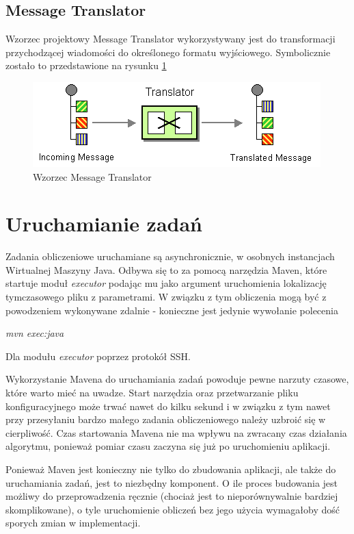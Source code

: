 \subsection{Message Translator}
Wzorzec projektowy Message Translator wykorzystywany jest do transformacji przychodzącej wiadomości do określonego formatu wyjściowego.
Symbolicznie zostało to przedstawione na rysunku \ref{fig:messageTranslator}

\begin{figure}[!h]
 \centering
 \includegraphics{eip/MessageTranslator}
 \caption{Wzorzec Message Translator}
 \label{fig:messageTranslator}
\end{figure}

\section{Uruchamianie zadań}

Zadania obliczeniowe uruchamiane są asynchronicznie, w osobnych instancjach Wirtualnej Maszyny Java.
Odbywa się to za pomocą narzędzia Maven, które startuje moduł {\it executor} podając mu jako argument uruchomienia lokalizację tymczasowego pliku z parametrami.
W związku z tym obliczenia mogą być z powodzeniem wykonywane zdalnie - konieczne jest jedynie wywołanie polecenia

{\it mvn exec:java}

Dla modułu {\it executor} poprzez protokół SSH.

Wykorzystanie Mavena do uruchamiania zadań powoduje pewne narzuty czasowe, które warto mieć na uwadze.
Start narzędzia oraz przetwarzanie pliku konfiguracyjnego może trwać nawet do kilku sekund i w związku z tym nawet przy przesyłaniu bardzo małego zadania obliczeniowego należy uzbroić się w cierpliwość.
Czas startowania Mavena nie ma wpływu na zwracany czas działania algorytmu, ponieważ pomiar czasu zaczyna się już po uruchomieniu aplikacji.

Ponieważ Maven jest konieczny nie tylko do zbudowania aplikacji, ale także do uruchamiania zadań, jest to niezbędny komponent.
O ile proces budowania jest możliwy do przeprowadzenia ręcznie (chociaż jest to nieporównywalnie bardziej skomplikowane), o tyle uruchomienie obliczeń bez jego użycia wymagałoby dość sporych zmian w implementacji.

